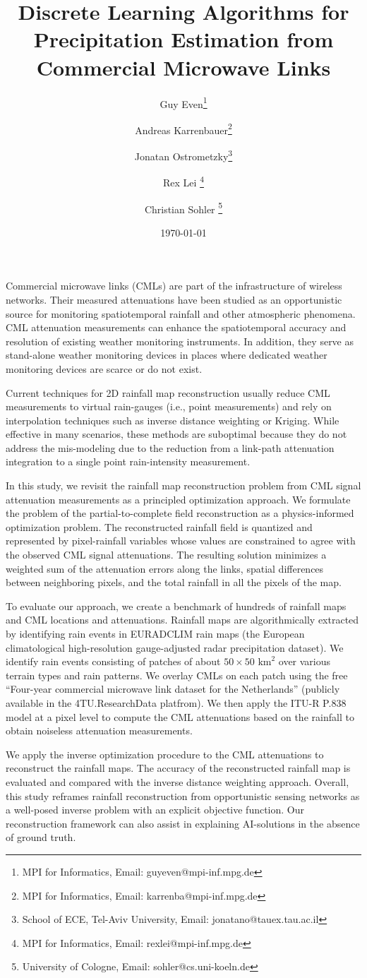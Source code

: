 \documentclass{article}
\title{Discrete Learning Algorithms for Precipitation Estimation from Commercial Microwave Links}
\author{Guy Even\thanks{MPI for Informatics, Email: guyeven@mpi-inf.mpg.de} 
\and
Andreas Karrenbauer\thanks{MPI for Informatics, Email: karrenba@mpi-inf.mpg.de}
\and Jonatan Ostrometzky\thanks{School of ECE, Tel-Aviv University, Email: jonatano@tauex.tau.ac.il}
\and Rex Lei \thanks{MPI for Informatics, Email: rexlei@mpi-inf.mpg.de}
\and Christian Sohler \thanks{University of Cologne, Email: sohler@cs.uni-koeln.de}}
\date{\today}
\begin{document}
\maketitle

Commercial microwave links (CMLs) are part of the infrastructure of wireless networks.  Their measured attenuations have been studied as an opportunistic source for monitoring spatiotemporal rainfall and other atmospheric phenomena. CML attenuation measurements can enhance the spatiotemporal accuracy and resolution of existing weather monitoring instruments. In addition, they serve as stand-alone weather monitoring devices in places where dedicated weather monitoring devices are scarce or do not exist.

Current techniques for 2D rainfall map reconstruction usually reduce CML measurements to virtual rain-gauges (i.e., point measurements) and rely on interpolation techniques such as inverse distance weighting or Kriging. While effective in many scenarios, these methods are suboptimal because they do not address the mis-modeling due to the reduction from a link-path attenuation integration to a single point rain-intensity measurement.

In this study, we revisit the rainfall map reconstruction problem from CML signal attenuation measurements as a principled optimization approach. We formulate the problem of the partial-to-complete field reconstruction as a physics-informed optimization problem. The reconstructed rainfall field is quantized and represented by pixel-rainfall variables whose values are constrained to agree with the observed CML signal attenuations. The resulting solution minimizes a weighted sum of the attenuation errors along the links, spatial differences between neighboring pixels, and the total rainfall in all the pixels of the map. 

To evaluate our approach, we create a benchmark of hundreds of rainfall maps and CML locations and attenuations.
Rainfall maps are algorithmically extracted by identifying rain events in EURADCLIM rain maps (the European climatological high-resolution gauge-adjusted radar precipitation dataset). We identify rain events consisting of patches of about $50\times 50$ $\text{km}^2$ over various terrain types and rain patterns.
We overlay CMLs on each patch using the free ``Four-year commercial microwave link dataset for the Netherlands'' (publicly available in the 4TU.ResearchData platfrom).
We then apply the ITU-R P.838 model at a pixel level to compute the CML attenuations based on the rainfall to obtain noiseless attenuation measurements. 

We apply the inverse optimization procedure to the CML attenuations to reconstruct the rainfall maps. The accuracy of the reconstructed rainfall map is evaluated and compared with the inverse distance weighting approach.
Overall, this study reframes rainfall reconstruction from opportunistic sensing networks as a well-posed inverse problem with an explicit objective function.
Our reconstruction framework can also assist in explaining AI-solutions in the absence of ground truth. 
\end{document}
